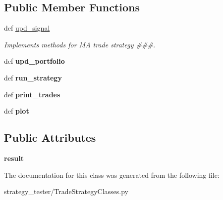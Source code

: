 \subsection*{\-Public \-Member \-Functions}
\begin{DoxyCompactItemize}
\item 
\hypertarget{classstrategy__tester_1_1TradeStrategyClasses_1_1MA__Trade__Strategy_adeb58fe7b3ab822c1c6187dea2cf68c0}{def \hyperlink{classstrategy__tester_1_1TradeStrategyClasses_1_1MA__Trade__Strategy_adeb58fe7b3ab822c1c6187dea2cf68c0}{upd\-\_\-signal}}\label{classstrategy__tester_1_1TradeStrategyClasses_1_1MA__Trade__Strategy_adeb58fe7b3ab822c1c6187dea2cf68c0}

\begin{DoxyCompactList}\small\item\em \-Implements methods for \-M\-A trade strategy \#\#\#. \end{DoxyCompactList}\item 
\hypertarget{classstrategy__tester_1_1TradeStrategyClasses_1_1MA__Trade__Strategy_a2830277e33b3a0120f9b14b662361a80}{def {\bfseries upd\-\_\-portfolio}}\label{classstrategy__tester_1_1TradeStrategyClasses_1_1MA__Trade__Strategy_a2830277e33b3a0120f9b14b662361a80}

\item 
\hypertarget{classstrategy__tester_1_1TradeStrategyClasses_1_1MA__Trade__Strategy_a276f47b9e3f316234594ce4f5bd9550b}{def {\bfseries run\-\_\-strategy}}\label{classstrategy__tester_1_1TradeStrategyClasses_1_1MA__Trade__Strategy_a276f47b9e3f316234594ce4f5bd9550b}

\item 
\hypertarget{classstrategy__tester_1_1TradeStrategyClasses_1_1MA__Trade__Strategy_a2360e80f86f5e3c5fde2b7336ed79b92}{def {\bfseries print\-\_\-trades}}\label{classstrategy__tester_1_1TradeStrategyClasses_1_1MA__Trade__Strategy_a2360e80f86f5e3c5fde2b7336ed79b92}

\item 
\hypertarget{classstrategy__tester_1_1TradeStrategyClasses_1_1MA__Trade__Strategy_a5e9d2e9e119914cbb5476eb345f886ef}{def {\bfseries plot}}\label{classstrategy__tester_1_1TradeStrategyClasses_1_1MA__Trade__Strategy_a5e9d2e9e119914cbb5476eb345f886ef}

\end{DoxyCompactItemize}
\subsection*{\-Public \-Attributes}
\begin{DoxyCompactItemize}
\item 
\hypertarget{classstrategy__tester_1_1TradeStrategyClasses_1_1MA__Trade__Strategy_a46144a005f545a3db6bce8ee3054a9c0}{{\bfseries result}}\label{classstrategy__tester_1_1TradeStrategyClasses_1_1MA__Trade__Strategy_a46144a005f545a3db6bce8ee3054a9c0}

\end{DoxyCompactItemize}


\-The documentation for this class was generated from the following file\-:\begin{DoxyCompactItemize}
\item 
strategy\-\_\-tester/\-Trade\-Strategy\-Classes.\-py\end{DoxyCompactItemize}
